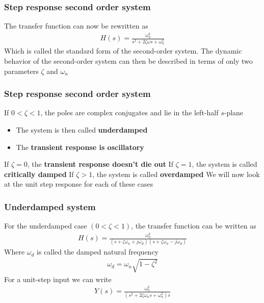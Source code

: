 \begin{frame}
\frametitle{Step response second order system}
The transfer function can now be rewritten as
\vspace{-0.5cm}
\begin{align*}
H(s) = \frac{\omega_n ^2}{s^2+2\zeta\omega s +\omega_n ^2}
\end{align*}
\vspace{0.2cm}
Which is called the standard form of the second-order system.
\vspace{0.25cm}
\vspace{0.3cm}
The dynamic behavior of the second-order system can then be described in terms of only two parameters $\zeta$ and $\omega_n$ 
\end{frame}

\begin{frame}
\frametitle{Step response second order system}
If $0<\zeta<1$, the poles are complex conjugates and lie in the left-half $s$-plane
\begin{itemize}
\item The system is then called \textbf{underdamped}
\vspace{0.15cm}
\item The \textbf{transient response is oscillatory}
\end{itemize}
\vspace{0.35cm}
If $\zeta=0$, the \textbf{transient response doesn't die out}
\vspace{0.35cm}
If $\zeta=1$, the system is called \textbf{critically damped}
\vspace{0.35cm}
If $\zeta>1$, the system is called \textbf{overdamped}
\vspace{0.35cm}
We will now look at the unit step response for each of these cases
\end{frame}

\begin{frame}
\frametitle{Underdamped system}
For the underdamped case $(0< \zeta< 1)$, the transfer function can be written as
\vspace{-0.25cm}
\begin{align*}
H(s)=\frac{\omega_n ^2}{(s+\zeta\omega_n+j\omega_d)(s+\zeta\omega_n-j\omega_d)}
\end{align*}
Where $\omega_d$ is called the damped natural frequency\\ 
\begin{align*}
\omega_d = \omega_n\sqrt{1-\zeta^2}
\end{align*}
\vspace{-0.15cm}
For a unit-step input we can write
\vspace{-0.25cm} 
\begin{align*}
Y(s)=\frac{\omega_n ^2}{(s^2+2\zeta\omega_n s+\omega_n ^2)s}
\end{align*}
\end{frame}

